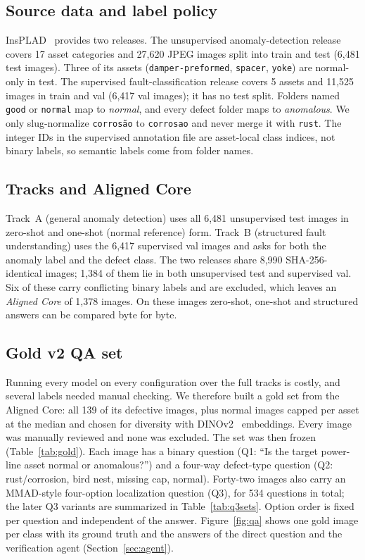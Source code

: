 \documentclass[11pt]{article}
\begin{document}
\subsection{Source data and label policy}
InsPLAD~\cite{vieira2023insplad} provides two releases. The unsupervised anomaly-detection release covers 17 asset categories and 27,620 JPEG images split into train and test (6,481 test images). Three of its assets (\texttt{damper-preformed}, \texttt{spacer}, \texttt{yoke}) are normal-only in test. The supervised fault-classification release covers 5 assets and 11,525 images in train and val (6,417 val images); it has no test split. Folders named \texttt{good} or \texttt{normal} map to \emph{normal}, and every defect folder maps to \emph{anomalous}. We only slug-normalize \texttt{corros\~ao} to \texttt{corrosao} and never merge it with \texttt{rust}. The integer IDs in the supervised annotation file are asset-local class indices, not binary labels, so semantic labels come from folder names.

\subsection{Tracks and Aligned Core}
Track~A (general anomaly detection) uses all 6,481 unsupervised test images in zero-shot and one-shot (normal reference) form. Track~B (structured fault understanding) uses the 6,417 supervised val images and asks for both the anomaly label and the defect class. The two releases share 8,990 SHA-256-identical images; 1,384 of them lie in both unsupervised test and supervised val. Six of these carry conflicting binary labels and are excluded, which leaves an \emph{Aligned Core} of 1,378 images. On these images zero-shot, one-shot and structured answers can be compared byte for byte.

\subsection{Gold v2 QA set}
Running every model on every configuration over the full tracks is costly, and several labels needed manual checking. We therefore built a gold set from the Aligned Core: all 139 of its defective images, plus normal images capped per asset at the median and chosen for diversity with DINOv2~\cite{oquab2024dinov2} embeddings. Every image was manually reviewed and none was excluded. The set was then frozen (Table~\ref{tab:gold}). Each image has a binary question (Q1: ``Is the target power-line asset normal or anomalous?'') and a four-way defect-type question (Q2: rust/corrosion, bird nest, missing cap, normal). Forty-two images also carry an MMAD-style four-option localization question (Q3), for 534 questions in total; the later Q3 variants are summarized in Table~\ref{tab:q3sets}. Option order is fixed per question and independent of the answer. Figure~\ref{fig:qa} shows one gold image per class with its ground truth and the answers of the direct question and the verification agent (Section~\ref{sec:agent}).
\end{document}
